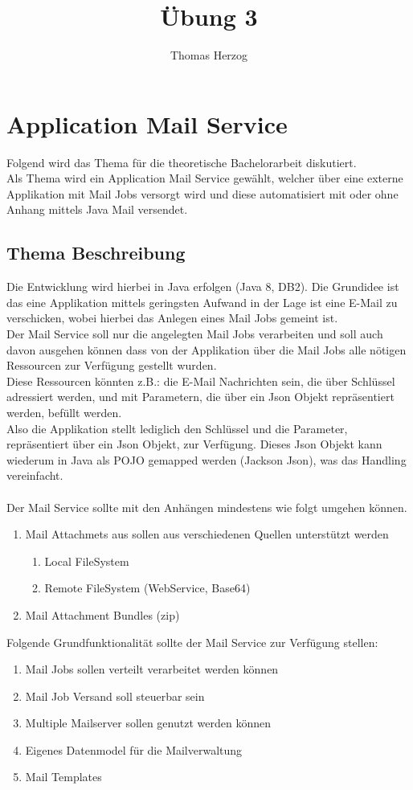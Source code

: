 \documentclass[11pt, a4paper, twoside]{article}   	%
\title{Übung 3}
\author{Thomas Herzog}
\begin{document}
\setlength{\headheight}{15mm}
{\color{myred}
	\section
		{Application Mail Service}
}
Folgend wird das Thema für die theoretische Bachelorarbeit diskutiert.\\
Als Thema wird ein Application Mail Service gewählt, welcher über eine externe Applikation mit Mail Jobs versorgt wird und diese automatisiert mit oder ohne Anhang mittels Java Mail versendet.\\

\subsection{Thema Beschreibung}
Die Entwicklung wird hierbei in Java erfolgen (Java 8, DB2).
Die Grundidee ist das eine Applikation mittels geringsten Aufwand in der Lage ist eine E-Mail zu verschicken, wobei hierbei das Anlegen eines Mail Jobs gemeint ist.\\
Der Mail Service soll nur die angelegten Mail Jobs verarbeiten und soll auch davon ausgehen können dass von der Applikation über die Mail Jobs alle nötigen Ressourcen zur Verfügung gestellt wurden.\\
Diese Ressourcen könnten z.B.: die E-Mail Nachrichten sein, die über Schlüssel adressiert werden, und mit Parametern, die über ein Json Objekt repräsentiert werden, befüllt werden.\\
Also die Applikation stellt lediglich den Schlüssel und die Parameter, repräsentiert über ein Json Objekt, zur Verfügung. Dieses Json Objekt kann wiederum in Java als POJO gemapped werden (Jackson Json), was das Handling vereinfacht.\\\\ 
Der Mail Service sollte mit den Anhängen mindestens wie folgt umgehen können.\\
\begin{enumerate}
	\item Mail Attachmets aus sollen aus verschiedenen Quellen unterstützt werden\begin{enumerate}
		\item Local FileSystem
		\item Remote FileSystem (WebService, Base64)
	\end{enumerate}
	\item Mail Attachment Bundles (zip)
\end{enumerate}
Folgende Grundfunktionalität sollte der Mail Service zur Verfügung stellen:\\
\begin{enumerate}
	\item Mail Jobs sollen verteilt verarbeitet werden können
	\item Mail Job Versand soll steuerbar sein 
	\item Multiple Mailserver sollen genutzt werden können
	\item Eigenes Datenmodel für die Mailverwaltung
	\item Mail Templates
\end{enumerate}
\end{document}
